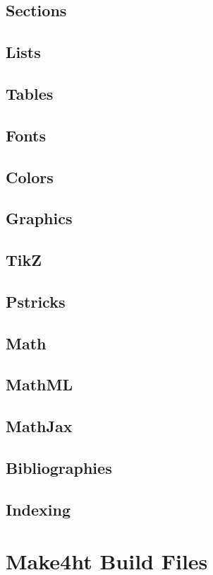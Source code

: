 \documentclass{book}
\begin{document}
\section{Sections}
\section{Lists}
\section{Tables}

\section{Fonts}
\section{Colors}

\section{Graphics}
\section{TikZ }
\section{Pstricks}

\section{Math}
\section{MathML}
\section{MathJax}

\section{Bibliographies}
\section{Indexing}

\chapter{Make4ht Build Files}
\end{document}
